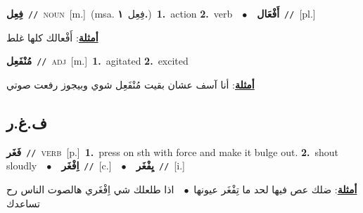 \documentclass[10pt,a4paper,twoside]{article} %
\begin{document}
\begin{multicols}{2}
{\setlength\topsep{0pt}\textbf{\foreignlanguage{arabic}{فِعِل}}\ {\color{gray}\texttt{//}\color{black}}\ \textsc{noun}\ [m.]\ \color{gray}(msa. \foreignlanguage{arabic}{فِعِل}~\foreignlanguage{arabic}{\textbf{١.}})\color{black}\ \textbf{1.}~action  \textbf{2.}~verb\ \ $\bullet$\ \ \setlength\topsep{0pt}\textbf{\foreignlanguage{arabic}{أَفْعَال}}\ {\color{gray}\texttt{//}\color{black}}\ [pl.]\  \begin{flushright}\color{gray}\foreignlanguage{arabic}{\textbf{\underline{\foreignlanguage{arabic}{أمثلة}}}: أَفْعالك كلها غلط}\end{flushright}\color{black}} \vspace{2mm}

{\setlength\topsep{0pt}\textbf{\foreignlanguage{arabic}{مُنْفَعِل}}\ {\color{gray}\texttt{//}\color{black}}\ \textsc{adj}\ [m.]\ \textbf{1.}~agitated  \textbf{2.}~excited\  \begin{flushright}\color{gray}\foreignlanguage{arabic}{\textbf{\underline{\foreignlanguage{arabic}{أمثلة}}}: أنا آسف عشان بقيت مُنْفَعِل شوي وبيجوز رفعت صوتي}\end{flushright}\color{black}} \vspace{2mm}

\vspace{-3mm}
\subsection*{\color{blue}\foreignlanguage{arabic}{ف.غ.ر}\color{blue}{}} 

{\setlength\topsep{0pt}\textbf{\foreignlanguage{arabic}{فَغَر}}\ {\color{gray}\texttt{//}\color{black}}\ \textsc{verb}\ [p.]\ \textbf{1.}~press on sth with force and make it bulge out.  \textbf{2.}~shout sloudly\ \ $\bullet$\ \ \setlength\topsep{0pt}\textbf{\foreignlanguage{arabic}{اِفْغَر}}\ {\color{gray}\texttt{//}\color{black}}\ [c.]\ \ $\bullet$\ \ \setlength\topsep{0pt}\textbf{\foreignlanguage{arabic}{يِفْغَر}}\ {\color{gray}\texttt{//}\color{black}}\ [i.]\  \begin{flushright}\color{gray}\foreignlanguage{arabic}{\textbf{\underline{\foreignlanguage{arabic}{أمثلة}}}: ضلك عص فيها لحد ما تِفْغَر عيونها\ $\bullet$\ \  اذا طلعلك شي اِفْغَري هالصوت الناس رح تساعدك}\end{flushright}\color{black}} \vspace{2mm}


\end{multicols}
\end{document}
